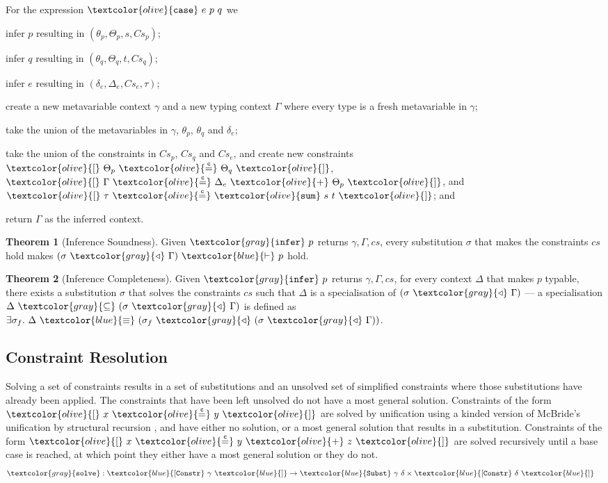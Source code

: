 \documentclass[sigplan,screen,review]{acmart}
\theoremstyle{definition}\newtheorem{mytheorem}{Theorem}[section]
\newcommand{\constr}[1]{\textcolor{olive}{\mathtt{#1}}}
\newcommand{\func}[1]{\textcolor{gray}{\mathtt{#1}}}
\newcommand{\type}[1]{\textcolor{blue}{\mathtt{#1}}}
\newcommand{\tEq}[2]{#1~\type{\equiv}~#2}
\newcommand{\tProc}[2]{#1 ~ \type{\vdash} ~ #2}
\newcommand{\tConstrs}[1]{\type{[Constr} ~ #1 ~ \type{]}}
\newcommand{\scase}{\constr{case}}
\newcommand{\tsum}{\constr{sum}}
\newcommand{\subst}[2]{#1 ~ \func{\triangleleft} ~ #2}
\newcommand{\tSubst}[2]{\type{Subst}~#1~#2}
\newcommand{\eqconstr}[2]{\constr{[} ~ #1 ~ \constr{\stackrel{c}{=}} ~ #2 ~ \constr{]}}
\newcommand{\sumconstr}[3]{\constr{[} ~ #1 ~ \constr{\stackrel{c}{=}} ~ #2 ~ \constr{+} ~ #3 ~ \constr{]}}
\begin{document}
For the expression $\scase~e~p~q$ we
  \begin{enumerate*}[label=\textcolor{gray}{\arabic*)}]
  \item infer $p$ resulting in $(\theta_p, \Theta_p, s , Cs_p)$;
  \item infer $q$ resulting in $(\theta_q, \Theta_q, t , Cs_q)$;
  \item infer $e$ resulting in $(\delta_e, \Delta_e, Cs_e, \tau)$;
  \item create a new metavariable context $\gamma$ and a new typing context $\Gamma$ where every type is a fresh metavariable in $\gamma$;
  \item take the union of the metavariables in $\gamma$, $\theta_p$, $\theta_q$ and $\delta_e$;
  \item take the union of the constraints in $Cs_p$, $Cs_q$ and $Cs_e$, and create new constraints $\eqconstr{\Theta_p}{\Theta_q}$, $\sumconstr{\Gamma}{\Delta_e}{\Theta_p}$, and $\eqconstr{\tau}{\tsum~s~t}$; and
  \item return $\Gamma$ as the inferred context.
\end{enumerate*}

\begin{mytheorem}[Inference Soundness]\label{inference-soundness}
Given $\func{infer}~p$ returns $\gamma , \Gamma , cs$, every substitution \(\sigma\) that makes the constraints $cs$ hold makes $\tProc{(\subst{\sigma}{\Gamma})}{p}$ hold.
\end{mytheorem}

\begin{mytheorem}[Inference Completeness]\label{inference-completeness}
Given $\func{infer}~p$ returns $\gamma , \Gamma , cs$, for every context \(\Delta\) that makes $p$ typable, there exists a substitution \(\sigma\) that solves the constraints $cs$ such that $\Delta$ is a specialisation of $(\subst{\sigma}{\Gamma})$ --- a specialisation $\Delta ~ \func{\subseteq} ~ (\subst{\sigma}{\Gamma})$ is defined as $\exists \sigma_f . ~ \tEq{\Delta}{(\subst{\sigma_f}{(\subst{\sigma}{\Gamma})})}$.
\end{mytheorem}

\subsection{Constraint Resolution}
\label{constraint-resolution}

Solving a set of constraints results in a set of substitutions and an unsolved set of simplified constraints where those substitutions have already been applied.
The constraints that have been left unsolved do not have a most general solution.
Constraints of the form $\eqconstr{x}{y}$ are solved by unification using a kinded version of McBride's unification by structural recursion \cite{McBride03}, and have either no solution, or a most general solution that results in a substitution.
Constraints of the form $\sumconstr{x}{y}{z}$ are solved recursively until a base case is reached, at which point they either have a most general solution or they do not.
$$
\begin{aligned}
\func{solve} &: \tConstrs{\gamma} \to \tSubst{\gamma}{\delta} \times \tConstrs{\delta}
\end{aligned}
$$
\end{document}

